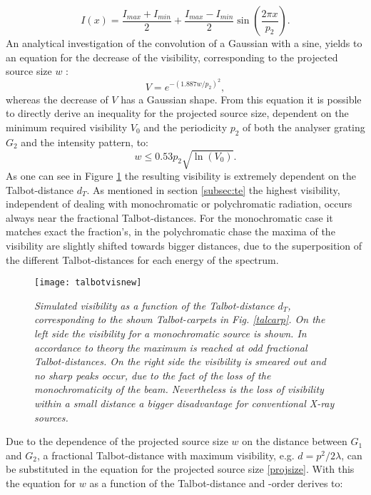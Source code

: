 \begin{equation}
I(x) = \frac{I_{max} + I_{min}}{2} +\frac{I_{max} - I_{min}}{2} \sin(\frac{2 \pi x}{p_{2}}).
\end{equation}
An analytical investigation of the convolution of a Gaussian with a sine, yields to an equation for the decrease of the visibility, corresponding to the projected source size $w$ \citep{WeitkampPfeiffer2006}:
\begin{equation}\label{visi}
V = e^{-(1.887w/p_{2})^{2}},
\end{equation}
whereas the decrease of $V$ has a Gaussian shape. From this equation it is possible to directly derive an inequality for the projected source size, dependent on the minimum required visibility $V_{0}$ and the periodicity $p_{2}$ of both the analyser grating $G_{2}$ and the intensity pattern, to:
\begin{equation} \label{w}
w \leq 0.53 p_{2} \sqrt{\ln(V_{0})}.
\end{equation}
As one can see in Figure \ref{talvis} the resulting visibility is extremely dependent on the Talbot-distance $d_{T}$. As mentioned in section \ref{subsec:te} the highest visibility, independent of dealing with monochromatic or polychromatic radiation, occurs always near the fractional Talbot-distances. For the monochromatic case it matches exact the fraction's, in the polychromatic chase the maxima of the visibility are slightly shifted towards bigger distances, due to the superposition of the different Talbot-distances for each energy of the spectrum. 
\begin{figure}[h]
	\begin{center}
		\texttt{[image: talbotvisnew]}
	\end{center}
	\caption[Simulated visibility as function of Talbot-distance $d_{T}$]{\textit{Simulated visibility as a function of the Talbot-distance $d_{T}$, corresponding to the shown Talbot-carpets in Fig. \ref{talcarp}. On the left side the visibility for a monochromatic source is shown. In accordance to theory the maximum is reached at odd fractional Talbot-distances. On the right side the visibility is smeared out and no sharp peaks occur, due to the fact of the loss of the monochromaticity of the beam. Nevertheless is the loss of visibility within a small distance a bigger disadvantage for conventional X-ray sources.}}  
	\label{talvis}
\end{figure}
Due to the dependence of the projected source size $w$ on the distance between $G_{1}$ and $G_{2}$, a fractional Talbot-distance with maximum visibility, e.g. $d = p^{2}/2\lambda$, can be substituted in the equation for the projected source size \ref{projsize}. With this the equation for $w$ as a function of the Talbot-distance and -order derives to:
